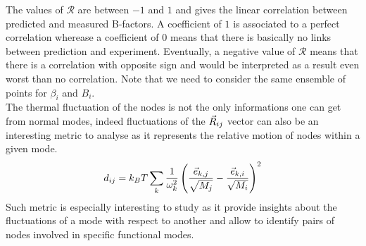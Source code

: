 The values of $\mathcal{R}$ are between $-1$ and $1$ and gives the linear correlation between predicted and measured B-factors. A coefficient of $1$ is associated to a perfect correlation wherease a coefficient of $0$ means that there is basically no links between prediction and experiment. Eventually, a negative value of $\mathcal{R}$ means that there is a correlation with opposite sign and would be interpreted as a result even worst than no correlation. Note that we need to consider the same ensemble of points for $\beta_i$ and $B_i$.\\
\noindent The thermal fluctuation of the nodes is not the only informations one can get from normal modes, indeed fluctuations of the $\vec{R}_{ij}$ vector can also be an interesting metric to analyse as it represents the relative motion of nodes within a given mode. 
\begin{equation}
	\label{metric dij}
	d_{ij} = k_BT\sum_k \frac{1}{\omega_k^2}\left( \frac{\vec{e}_{k, j}}{\sqrt{M_j}} - \frac{\vec{e}_{k, i}}{\sqrt{M_i}} \right)^2
\end{equation}
Such metric is especially interesting to study as it provide insights about the fluctuations of a mode with respect to another and allow to identify pairs of nodes involved in specific functional modes.


